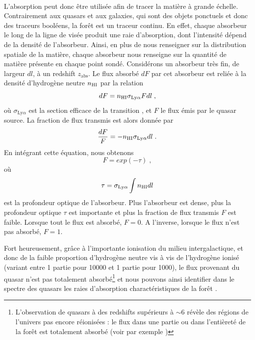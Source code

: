 \paragraph{}
L'absorption \lya{} peut donc être utilisée afin de tracer la matière à grande échelle. Contrairement aux quasars et aux galaxies, qui sont des objets ponctuels et donc des traceurs booléens, la forêt \lya{} est un traceur continu. En effet, chaque absorbeur le long de la ligne de visée produit une raie d'absorption, dont l'intensité dépend de la densité de l'absorbeur. Ainsi, en plus de nous renseigner sur la distribution spatiale de la matière, chaque absorbeur nous renseigne sur la quantité de matière présente en chaque point sondé.
Considérons un absorbeur très fin, de largeur $dl$, à un redshift $z_{\mathrm{abs}}$. Le flux absorbé $dF$ par cet absorbeur est reliée à la densité d'hydrogène neutre $n_{\textsc{HI}}$ par la relation
\begin{equation}
  dF = n_{\textsc{HI}} \sigma_{\mathrm{Ly}\alpha} F dl  \; ,
\end{equation}
où $\sigma_{\mathrm{Ly}\alpha}$ est la section efficace de la transition \lya{}, et $F$ le flux émis par le quasar source.
La fraction de flux transmis est alors donnée par
\begin{equation}
 \frac{dF}{F} = - n_{\textsc{HI}} \sigma_{\mathrm{Ly}\alpha} dl  \; .
\end{equation}
En intégrant cette équation, nous obtenons
\begin{equation}
  \label{eq:tff}
  F = exp(- \tau) \; ,
\end{equation}
où
\begin{equation}
  \label{eq:tau}
  \tau = \sigma_{\mathrm{Ly}\alpha} \int n_{\textsc{HI}}   dl
\end{equation}
est la profondeur optique de l'absorbeur. Plus l'absorbeur est dense, plus la profondeur optique $\tau$ est importante et plus la fraction de flux transmis $F$ est faible. Lorsque tout le flux est absorbé, $F = 0$. A l'inverse, lorsque le flux n'est pas absorbé, $F = 1$.

Fort heureusement, grâce à l'importante ionisation du milieu intergalactique, et donc de la faible proportion d'hydrogène neutre vis à vis de l'hydrogène ionisé (variant entre \num{1} partie pour \num{10000} et \num{1} partie pour \num{1000}), le flux provenant du quasar n'est pas totalement absorbé\footnote{L'observation de quasars à des redshifts supérieurs à $\sim 6$ révèle des régions de l'univers pas encore réionisées : le flux dans une partie ou dans l'entièreté de la forêt \lya{} est totalement absorbé (voir par exemple \textcite{Wang2018})} et nous pouvons ainsi identifier dans le spectre des quasars les raies d'absorption charactéristiques de la forêt \lya{}.

